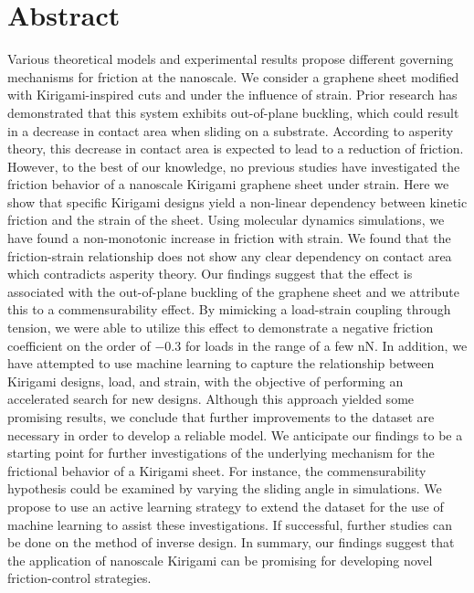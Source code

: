 \chapter*{Abstract} 


Various theoretical models and experimental results propose different governing
mechanisms for friction at the nanoscale. We consider a graphene sheet modified
with Kirigami-inspired cuts and under the influence of strain. Prior research
has demonstrated that this system exhibits out-of-plane buckling, which could
result in a decrease in contact area when sliding on a substrate. According to
asperity theory, this decrease in contact area is expected to lead to a
reduction of friction. However, to the best of our knowledge, no previous
studies have investigated the friction behavior of a nanoscale Kirigami graphene
sheet under strain. Here we show that specific Kirigami designs yield a
non-linear dependency between kinetic friction and the strain of the sheet.
Using molecular dynamics simulations, we have found a non-monotonic increase in
friction with strain. We found that the friction-strain relationship does not
show any clear dependency on contact area which contradicts asperity theory. Our
findings suggest that the effect is associated with the out-of-plane buckling of
the graphene sheet and we attribute this to a commensurability effect. By
mimicking a load-strain coupling through tension, we were able to utilize this
effect to demonstrate a negative friction coefficient on the order of $-0.3$ for
loads in the range of a few nN. In addition, we have attempted to use machine
learning to capture the relationship between Kirigami designs, load, and strain,
with the objective of performing an accelerated search for new designs. Although this approach yielded some promising results, we conclude that further
improvements to the dataset are necessary in order to develop a reliable model. We anticipate our findings to be a starting point for further investigations of
the underlying mechanism for the frictional behavior of a Kirigami sheet. For
instance, the commensurability hypothesis could be examined by varying the
sliding angle in simulations. We propose to use an active learning strategy to
extend the dataset for the use of machine learning to assist these
investigations. If successful, further studies can be done on the method of
inverse design. In summary, our findings suggest that the application of
nanoscale Kirigami can be promising for developing novel friction-control
strategies.
